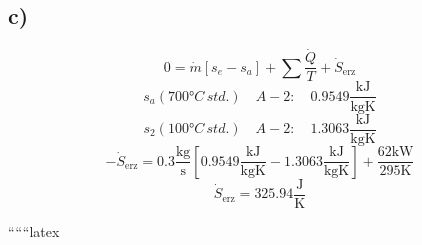 

\subsection*{c)}
\[
0 = \dot{m} \left[ s_e - s_a \right] + \sum \frac{\dot{Q}}{T} + \dot{S}_{\text{erz}}
\]
\[
s_a \left( 700°C \, std. \right) \quad A-2: \quad 0.9549 \frac{\text{kJ}}{\text{kgK}}
\]
\[
s_2 \left( 100°C \, std. \right) \quad A-2: \quad 1.3063 \frac{\text{kJ}}{\text{kgK}}
\]
\[
- \dot{S}_{\text{erz}} = 0.3 \frac{\text{kg}}{\text{s}} \left[ 0.9549 \frac{\text{kJ}}{\text{kgK}} - 1.3063 \frac{\text{kJ}}{\text{kgK}} \right] + \frac{62 \text{kW}}{295 \text{K}}
\]
\[
\dot{S}_{\text{erz}} = 325.94 \frac{\text{J}}{\text{K}}
\]

``````latex